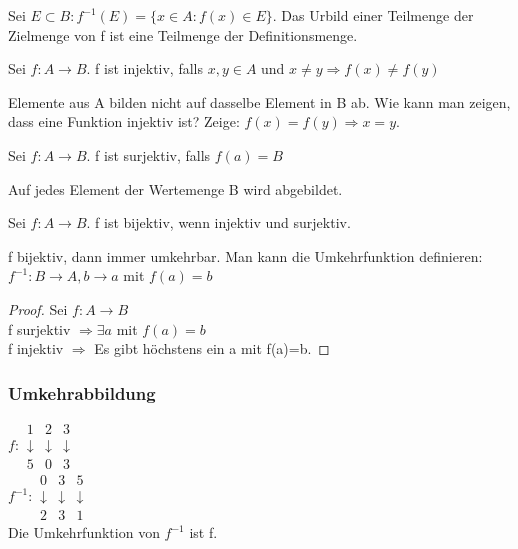 \begin{defi}
Sei $E\subset B: f^{-1}(E)=\{x\in A: f(x)\in E\}$.
Das Urbild einer Teilmenge der Zielmenge von f ist eine Teilmenge der Definitionsmenge.
\end{defi}

\begin{defi}
Sei $f:A\rightarrow B$. f ist injektiv, falls $x,y\in A$ und $x\neq y \Rightarrow f(x)\neq f(y)$
\end{defi}
Elemente aus A bilden nicht auf dasselbe Element in B ab. Wie kann man zeigen, dass eine Funktion injektiv ist? Zeige: $f(x)=f(y) \Rightarrow x=y$.

\begin{defi}
Sei $f:A\rightarrow B$. f ist surjektiv, falls $f(a)=B$
\end{defi}
Auf jedes Element der Wertemenge B wird abgebildet.  

\begin{defi}[bijektiv]
Sei $f:A\rightarrow B$. f ist bijektiv, wenn injektiv und surjektiv.
\end{defi}
f bijektiv, dann immer umkehrbar. Man kann die Umkehrfunktion definieren: $f^{-1}:B\rightarrow A, b\rightarrow a$ mit $f(a)=b$
\begin{proof}Sei $f:A\rightarrow B$\\
f surjektiv $\Rightarrow \exists a$ mit $f(a)=b$\\
f injektiv $\Rightarrow$ Es gibt höchstens ein a mit f(a)=b.
\end{proof}

\subsubsection{Umkehrabbildung}
$f:
\begin{array}{ccc}
1 & 2 & 3 \\ 
\downarrow & \downarrow & \downarrow \\ 
5 & 0 & 3
\end{array} 
$
\\
$f^{-1}:
\begin{array}{ccc}
0 & 3 & 5 \\ 
\downarrow & \downarrow & \downarrow \\ 
2 & 3 & 1
\end{array} 
$
\\
Die Umkehrfunktion von $f^{-1}$ ist f.


